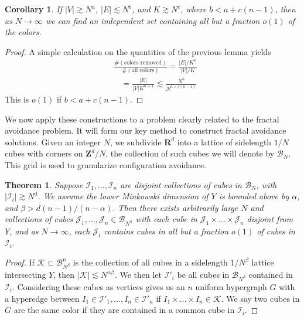 \documentclass{article}
\theoremstyle{plain}
\newtheorem*{corollary}{Corollary}
\theoremstyle{plain}
\newtheorem{theorem}{Theorem}
\begin{document}
\begin{multicols}{2}
\begin{corollary}
	If $|V| \gtrsim N^a$, $|E| \lesssim N^b$, and $K \gtrsim N^c$, where $b < a + c(n-1)$, then as $N \to \infty$ we can find an independent set containing all but a fraction $o(1)$ of the colors.
\end{corollary}
\begin{proof}
	A simple calculation on the quantities of the previous lemma yields
	\begin{align*}
		&\frac{\# ( \text{colors removed} )}{\# ( \text{all colors} )} = \frac{|E|/K^n}{|V|/K}\\
		&\ \ \ \ = \frac{|E|}{|V|K^{n-1}} \lesssim \frac{N^b}{N^{a + c(n-1)}}
	\end{align*}
	This is $o(1)$ if $b < a + c(n-1)$.
\end{proof}

We now apply these constructions to a problem clearly related to the fractal avoidance problem. It will form our key method to construct fractal avoidance solutions. Given an integer $N$, we subdivide $\mathbf{R}^d$ into a lattice of sidelength $1/N$ cubes with corners on $\mathbf{Z}^d/N$, the collection of such cubes we will denote by $\mathcal{B}_N$. This grid is used to granularize configuration avoidance.

\begin{theorem}
	Suppose $\mathcal{I}_1, \dots, \mathcal{I}_n$ are disjoint collections of cubes in $\mathcal{B}_N$, with $|\mathcal{I}_i| \gtrsim N^d$. We assume the lower Minkowski dimension of $Y$ is bounded above by $\alpha$, and $\beta > d(n-1)/(n-\alpha)$. Then there exists arbitrarily large $N$ and collections of cubes $\mathcal{J}_1, \dots, \mathcal{J}_n \in \mathcal{B}_{N^\beta}$ with each cube in $\mathcal{J}_1 \times \dots \times \mathcal{J}_n$ disjoint from $Y$, and as $N \to \infty$, each $\mathcal{J}_i$ contains cubes in all but a fraction $o(1)$ of cubes in $\mathcal{I}_i$.
\end{theorem}
\begin{proof}
	If $\mathcal{K} \subset \mathcal{B}_{N^\beta}^n$ is the collection of all cubes in a sidelength $1/N^\beta$ lattice intersecting $Y$, then $|\mathcal{K}| \lesssim N^{\alpha \beta}$. We then let $\mathcal{I}'_i$ be all cubes in $\mathcal{B}_{N^\beta}$ contained in $\mathcal{I}_i$. Considering these cubes as vertices gives us an $n$ uniform hypergraph $G$ with a hyperedge between $I_1 \in \mathcal{I}'_1, \dots, I_n \in \mathcal{I}'_n$ if $I_1 \times \dots \times I_n \in \mathcal{K}$. We say two cubes in $G$ are the same color if they are contained in a common cube in $\mathcal{I}_i$.


\end{proof}
\end{multicols}
\end{document}
